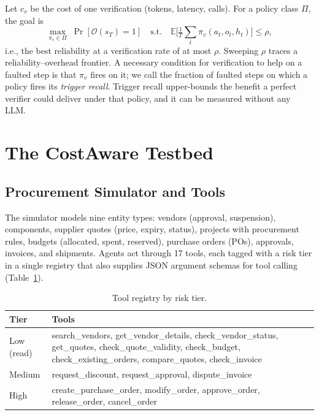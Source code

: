 \documentclass[conference]{IEEEtran}
\begin{document}
Let $c_v$ be the cost of one verification (tokens, latency, calls). For a policy class
$\Pi$, the goal is
\begin{equation}
\max_{\pi_v \in \Pi} \; \Pr[\mathcal{O}(s_T)=1]
\quad \text{s.t.} \quad
\mathbb{E}\Big[\tfrac{1}{T}\textstyle\sum_t \pi_v(a_t,o_t,h_t)\Big] \le \rho ,
\label{eq:objective}
\end{equation}
i.e., the best reliability at a verification rate of at most $\rho$. Sweeping $\rho$ traces
a reliability--overhead frontier. A necessary condition for verification to help on a
faulted step is that $\pi_v$ fires on it; we call the fraction of faulted steps on which a
policy fires its \emph{trigger recall}. Trigger recall upper-bounds the benefit a perfect
verifier could deliver under that policy, and it can be measured without any LLM.

\section{The CostAware Testbed}
\label{sec:testbed}

\subsection{Procurement Simulator and Tools}
The simulator models nine entity types: vendors (approval, suspension), components,
supplier quotes (price, expiry, status), projects with procurement rules, budgets
(allocated, spent, reserved), purchase orders (POs), approvals, invoices, and shipments.
Agents act through 17 tools, each tagged with a risk tier in a single registry that also
supplies JSON argument schemas for tool calling (Table~\ref{tab:tools}).

\begin{table}[t]
\caption{Tool registry by risk tier.}
\label{tab:tools}
\centering
\footnotesize
\begin{tabular}{@{}p{}p{}@{}}
\toprule
Tier & Tools \\
\midrule
Low (read) & search\_vendors, get\_vendor\_details, check\_vendor\_status, get\_quotes,
check\_quote\_validity, check\_budget, check\_existing\_orders, compare\_quotes, check\_invoice \\
Medium & request\_discount, request\_approval, dispute\_invoice \\
High & create\_purchase\_order, modify\_order, approve\_order, release\_order, cancel\_order \\
\bottomrule
\end{tabular}
\end{table}
\end{document}
